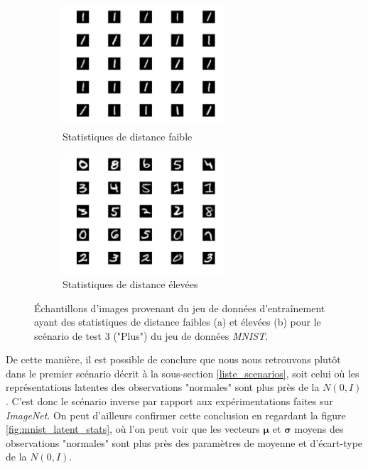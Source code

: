 \begin{figure}[h]
	\centering
	\begin{subfigure}{6cm}
		\centering\includegraphics[width=6cm]{images/images_davae/mnist_small_distance}
		\caption{Statistiques de distance faible}
	\end{subfigure}
	\begin{subfigure}{6cm}
		\centering\includegraphics[width=6cm]{images/images_davae/mnist_large_distance}
		\caption{Statistiques de distance élevées}
	\end{subfigure}
	\caption[Échantillons d'images provenant du jeu de données d'entraînement ayant des statistiques de distance faibles et élevées.]{Échantillons d'images provenant du jeu de données d'entraînement ayant des statistiques de distance faibles (a) et élevées (b) pour le scénario de test 3 ("Plus") du jeu de données \textit{MNIST}.}
	\label{fig:latentes_images_mnist}
\end{figure}

De cette manière, il est possible de conclure que nous nous retrouvons plutôt dans le premier scénario décrit à la sous-section \ref{liste_scenarios}, soit celui où les représentations latentes des observations "normales" sont plus près de la $N(0,I)$. C'est donc le scénario inverse par rapport aux expérimentations faites sur \textit{ImageNet}. On peut d'ailleurs confirmer cette conclusion en regardant la figure \ref{fig:mnist_latent_stats}, où l'on peut voir que les vecteurs $\boldsymbol{\mu}$ et $\boldsymbol{\sigma}$ moyens des observations "normales" sont plus près des paramètres de moyenne et d'écart-type de la $N(0,I)$.

